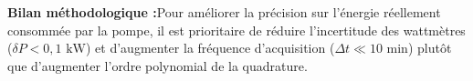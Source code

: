 \documentclass[10pt,a4paper]{article}
\newcommand{\takeaway}[2]{%
  \vspace{4pt}\noindent\colorbox{primary!8}{%
    \parbox{\dimexpr\textwidth-2\fboxsep\relax}{%
      \vspace{4pt}\textbf{\color{primary}#1 :}\hspace{0.4em}#2\vspace{4pt}%
    }%
  }\vspace{4pt}%
}
\begin{document}
\takeaway{Bilan méthodologique}{Pour améliorer la précision sur l'énergie réellement consommée par la pompe, il est prioritaire de réduire l'incertitude des wattmètres ($\delta P < 0,1\text{ kW}$) et d'augmenter la fréquence d'acquisition ($\Delta t \ll 10\text{ min}$) plutôt que d'augmenter l'ordre polynomial de la quadrature.}
\end{document}
